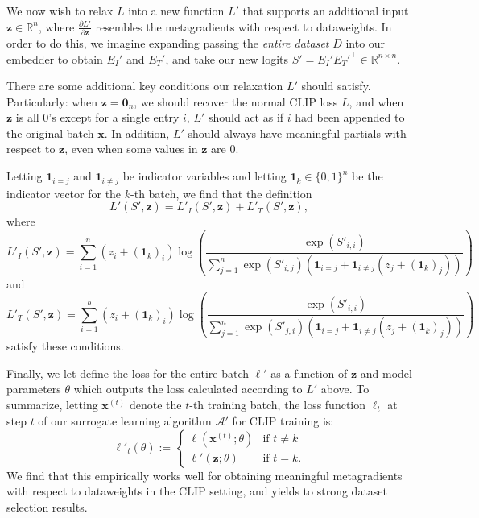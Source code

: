 We now wish to relax $L$ into a new function $L'$ that supports an additional
input $\mathbf{z} \in \mathbb{R}^n$, where $\frac{\partial L'}{\partial
\mathbf{z}}$ resembles the metagradients with respect to dataweights.  In order
to do this, we imagine expanding passing the \emph{entire dataset} $D$ into our
embedder to obtain $E_I'$ and $E_T'$, and take our new logits $S' = E_I'
E_T'^\top \in \mathbb{R}^{n \times n}$.

There are some additional key conditions our relaxation $L'$ should satisfy. 
Particularly:  when $\mathbf{z} = \mathbf{0}_n$, we should recover the normal
CLIP loss $L$, and when $\mathbf{z}$ is all 0's except for a single entry $i$,
$L'$ should act as if $i$ had been appended to the original batch $\mathbf{x}$.
In addition, $L'$ should always have meaningful partials with
respect to $\mathbf{z}$, even when some values in $\mathbf{z}$ are 0.  

Letting $\mathbf{1}_{i = j}$ and $\mathbf{1}_{i \neq j}$ be indicator variables
and letting $\mathbf{1}_{k} \in \{0, 1\}^n$ be the indicator vector for the
$k$-th batch, we find that the definition
\[
	L'(S', \mathbf{z}) = L'_I(S', \mathbf{z}) + L'_T(S', \mathbf{z}),
\]
where
\[
	L'_I(S', \mathbf{z}) = \sum_{i=1}^n
	(z_i + (\mathbf{1}_{k})_i) \log \left(
      \frac{\exp(S'_{i,i})}
	  {\sum_{j=1}^n \exp(S'_{i,j}) \left(\mathbf{1}_{i = j} + \mathbf{1}_{i \neq j} (z_j + (\mathbf{1}_k)_j)\right)}
    \right)
\]
and
\[
	L'_T(S', \mathbf{z}) = \sum_{i=1}^b 
	(z_i + (\mathbf{1}_{k})_i) \log \left(
      \frac{\exp(S'_{i,i})}
	  {\sum_{j=1}^n \exp(S'_{j,i}) \left(\mathbf{1}_{i = j} + \mathbf{1}_{i \neq j} (z_j + (\mathbf{1}_k)_j)\right)}
    \right)
\]
satisfy these conditions.  

Finally, we let define the loss for the entire batch $\ell'$ as a function of $\mathbf{z}$ and model parameters $\theta$ which outputs the loss calculated according to $L'$ above.
To summarize, letting $\mathbf{x}^{(t)}$ denote the $t$-th training batch, the loss function $\ell_t$ at step $t$ of our surrogate learning algorithm $\mathcal{A}'$ for CLIP training is:
\begin{equation*}
	\label{eq:surrogate_objective_new}
    \ell'_t(\theta) := 
    \begin{cases}
		\ell(\mathbf{x}^{(t)}; \theta) & \text{if } t \neq k \\
		\ell'(\mathbf{z}; \theta) & \text{if } t = k.
    \end{cases}
\end{equation*}
We find that this empirically works well for obtaining meaningful
metagradients with respect to dataweights in the CLIP setting, and yields to strong dataset selection results.

